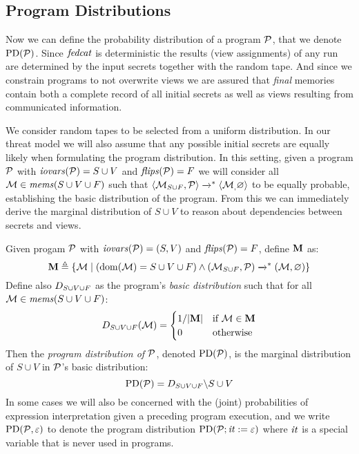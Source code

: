 \subsection{Program Distributions}
Now we can define the probability distribution of a program $\mathcal{P}$,
that we denote $\mathrm{PD}(\mathcal{P})$. Since $\mathit{fedcat}$ is deterministic the
results (view assignments) of any run are determined by the input
secrets together with the random tape. And since we constrain programs
to not overwrite views we are assured that \emph{final} memories
contain both a complete record of all initial secrets as well as views
resulting from communicated information.

We consider random tapes to be selected from a uniform distribution.
In our threat model we will also assume that any possible initial
secrets are equally likely when formulating the program distribution.
In this setting, given a program $\mathcal{P}$ with $\mathit{iovars}(\mathcal{P}) = S \cup
V$ and $\mathit{flips}(\mathcal{P}) = F$ we will consider all $\mathcal{M}
\in \mathit{mems}(S \cup V \cup F)$ such that
$
\langle \mathcal{M}_{S \cup F},\mathcal{P} \rangle \xrightarrow{}^{*} \langle \mathcal{M}_,\varnothing \rangle
$
to be equally probable, establishing the basic distribution of the
program. From this we can immediately derive the marginal distribution
of $S \cup V$ to reason about dependencies between secrets and views. 
\begin{definition}
  \label{def-progd}
  Given progam $\mathcal{P}$ with $\mathit{iovars}(\mathcal{P}) = (S,V)$ and $\mathit{flips}(\mathcal{P}) = F$, define $\mathbf{M}$ as:
  $$
  \mathbf{M} \triangleq \{ \mathcal{M} \mid (\mathrm{dom}(\mathcal{M}) = S \cup V \cup F) \wedge (\mathcal{M}_{S \cup F},\mathcal{P}) \xrightarrow{}^{*} (\mathcal{M},\varnothing) \}
  $$
  Define also $D_{S \cup V \cup F}$ as the program's \emph{basic distribution} such that for all
  $\mathcal{M} \in \mathit{mems}(S \cup V \cup F)$:
  $$
  D_{S \cup V \cup F}(\mathcal{M}) =
  \begin{cases}
    1 / |\mathbf{M}| & \text{if}\ \mathcal{M} \in \mathbf{M}\\
    0 & \text{otherwise}
  \end{cases}
  $$
  Then the \emph{program distribution of $\mathcal{P}$}, denoted $\mathrm{PD}(\mathcal{P})$, is the
  marginal distribution of $S \cup V$ in $\mathcal{P}$'s basic distribution:
  $$
  \mathrm{PD}(\mathcal{P}) =  D_{S \cup V \cup F}\backslash S\cup V
  $$
  In some cases we will also be concerned with the (joint)
  probabilities of expression interpretation given a preceding program
  execution, and we write $\mathrm{PD}(\mathcal{P}, \varepsilon)$ to denote the program
  distribution $\mathrm{PD}(\mathcal{P};\mathit{it} := \varepsilon)$ where $\mathit{it}$ is a
  special variable that is never used in programs.
\end{definition}

